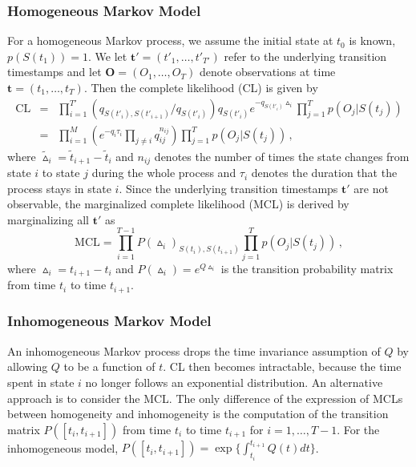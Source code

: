 \documentclass{article}
\begin{document}
\subsubsection{Homogeneous Markov Model} \label{sec:homogeneous}
For a homogeneous Markov process, we assume the initial state at $t_0$ is known, $p(S(t_1)) = 1$. We let $\bm t' = (t'_1, \ldots, t'_{T'})$ refer to the underlying transition timestamps and let $\bm O = (O_1, \ldots, O_T)$ denote observations at time $\bm t = (t_1, \ldots, t_T)$. Then the complete likelihood (CL) is given by 
\begin{eqnarray}
\mathrm{CL} & = & \prod_{i = 1}^{T'}(q_{S(t'_i),S(t'_{i+1})}/q_{S(t'_i)})q_{S(t'_i)}e^{-q_{S(t'_i)}\vartriangle_i} \prod_{j = 1}^Tp(O_j|S(t_j)) \nonumber\\
& = & \prod_{i = 1}^{M}\left(e^{-q_i\tau_i} \prod_{j\neq i} q_{ij}^{n_{ij}}\right)\prod_{j=1}^Tp(O_j|S(t_j))\,,
\label{CL}
\end{eqnarray}
where $\tilde{\vartriangle}_i = \tilde{t}_{i+1} - \tilde{t}_i$ and $n_{ij}$ denotes the number of times the state changes from state $i$ to state $j$ during the whole process and $\tau_i$ denotes the duration that the process stays in state $i$.
Since the underlying transition timestamps $\bm t'$ are not observable, the marginalized complete likelihood (MCL) is derived by marginalizing all $\bm t'$ as
\begin{equation*}
\mathrm{MCL} = \prod_{i = 1}^{T-1}P(\vartriangle_i)_{S(t_i), S(t_{i+1})}\prod_{j = 1}^T p(O_j|S(t_j)) \,,
\end{equation*}
where $\vartriangle_i = t_{i+1} - t_i$ and $P(\vartriangle_i) = e^{Q \vartriangle_i }$ is the transition probability matrix from time $t_i$ to time $t_{i+1}$.  

\subsubsection{Inhomogeneous Markov Model} \label{sec:inhomogeneous}

An inhomogeneous Markov process drops the time invariance assumption of $Q$ by allowing $Q$ to be a function of $t$. CL then becomes intractable, because the time spent in state $i$ no longer follows an exponential distribution. An alternative approach is to consider the MCL. The only difference of the expression of MCLs between homogeneity and inhomogeneity is the computation of the transition matrix $P([t_i, t_{i+1}])$ from time $t_i$ to time $t_{i+1}$ for $i = 1, \ldots, T - 1$. For the inhomogeneous model, $P([t_i, t_{i+1}]) = \exp\{{\int _{t_i}^{t_{i+1}}Q(t)dt}\}$.
\end{document}
